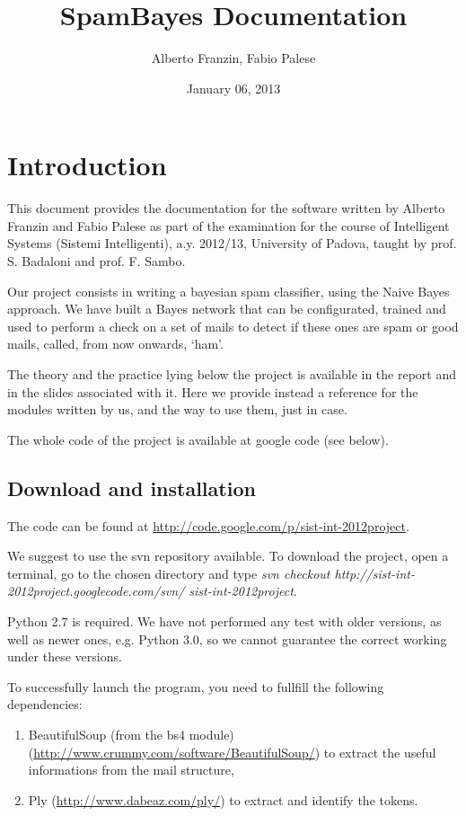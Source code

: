 \documentclass[letterpaper,10pt,english]{sphinxmanual}
\title{SpamBayes Documentation}
\date{January 06, 2013}
\author{Alberto Franzin, Fabio Palese}
\begin{document}
\maketitle
\tableofcontents
{}\label{index::doc}



\chapter{Introduction}
\label{index:introduction}\label{index:spambayes-s-documentation}
This document provides the documentation for the software written by Alberto Franzin and Fabio Palese as part of the examination for the course of Intelligent Systems (Sistemi Intelligenti), a.y. 2012/13, University of Padova, taught by prof. S. Badaloni and prof. F. Sambo.

Our project consists in writing a bayesian spam classifier, using the Naive Bayes approach. We have built a Bayes network that can be configurated, trained and used to perform a check on a set of mails to detect if these ones are spam or good mails, called, from now onwards, `ham'.

The theory and the practice lying below the project is available in the report and in the slides associated with it. Here we provide instead a reference for the modules written by us, and the way to use them, just in case.

The whole code of the project is available at google code (see below).


\section{Download and installation}
\label{index:download-and-installation}
The code can be found at \href{http://code.google.com/p/sist-int-2012project}{http://code.google.com/p/sist-int-2012project}.

We suggest to use the svn repository available. To download the project, open a terminal, go to the chosen directory and type
\emph{svn checkout http://sist-int-2012project.googlecode.com/svn/ sist-int-2012project}.

Python 2.7 is required. We have not performed any test with older versions, as well as newer ones, e.g. Python 3.0, so we cannot guarantee the correct working under these versions.

To successfully launch the program, you need to fullfill the following dependencies:
\begin{enumerate}
\item {} 
BeautifulSoup (from the bs4 module) (\href{http://www.crummy.com/software/BeautifulSoup/}{http://www.crummy.com/software/BeautifulSoup/}) to extract the useful informations from the mail structure,

\item {} 
Ply (\href{http://www.dabeaz.com/ply/}{http://www.dabeaz.com/ply/}) to extract and identify the tokens.

\end{enumerate}
\end{document}
